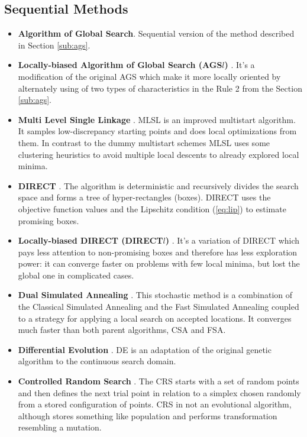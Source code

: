 \documentclass{svproc}
\begin{document}
\subsection{Sequential Methods}
\begin{itemize}
  \item \textbf{Algorithm of Global Search}. Sequential version of the method described in Section
\ref{sub:ags}.

  \item \textbf{Locally-biased Algorithm of Global Search (AGS\(l\))} \cite{indexMethod}. It's a
modification of
  the original AGS which make it more locally oriented by alternately using of two types of
characteristics in the Rule 2 from the Section \ref{sub:ags}.

  \item \textbf{Multi Level Single Linkage} \cite{Kan1987StochasticGO}. MLSL is an improved
multistart algorithm.
  It samples low-discrepancy starting points and does local optimizations from them. In contrast to
the dummy multistart schemes
  MLSL uses some clustering heuristics to avoid multiple local descents to already explored local
minima.

  \item \textbf{DIRECT} \cite{Jones2009}. The algorithm is deterministic and recursively divides
the search space and forms a tree of hyper-rectangles (boxes). DIRECT uses the objective function
values and the Lipschitz condition (\ref{eq:lip}) to estimate promising boxes.

  \item \textbf{Locally-biased DIRECT (DIRECT$l$)} \cite{Gablonsky2001}. It's a variation of
DIRECT which pays less attention to non-promising boxes and therefore
  has less exploration power: it can converge faster on problems with few local minima, but lost the
global one in complicated cases.

  \item \textbf{Dual Simulated Annealing} \cite{XIANG1997216}. This stochastic method is a
combination of the Classical Simulated Annealing and the Fast Simulated Annealing coupled to a
strategy for applying a local search on accepted locations. It converges much faster than both parent
algorithms, CSA and FSA.

  \item \textbf{Differential Evolution} \cite{Storn1997}. DE is an adaptation of the original genetic
algorithm to
  the continuous search domain.

  \item \textbf{Controlled Random Search} \cite{Price1983}. The CRS starts with a set of random
points and then defines
  the next trial point in relation to a simplex chosen randomly from a stored configuration of points.
CRS in not an
  evolutional algorithm, although stores something like population and performs transformation
resembling a mutation.


\end{itemize}
\end{document}
